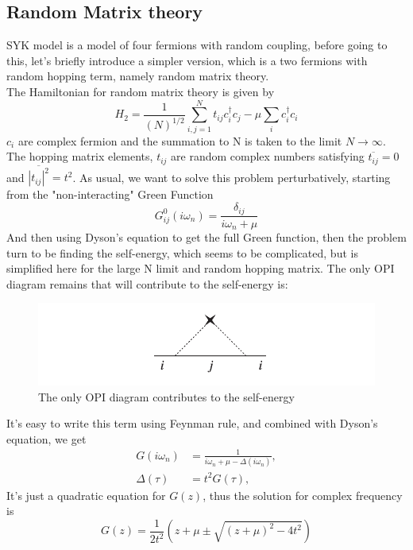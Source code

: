 \documentclass[10pt,openany]{book}
\theoremstyle{thmstyle} %
\theoremstyle{defstyle} %
\theoremstyle{prostyle} %
\begin{document}
\subsection{Random Matrix theory}
SYK model is a model of four fermions with random coupling, before going to this, let's briefly introduce a simpler version, which is a two fermions with random hopping term, namely random matrix theory.\\
The Hamiltonian for random matrix theory is given by
\begin{equation}
  H_2=\frac{1}{(N)^{1 / 2}} \sum_{i, j=1}^N t_{i j} c_i^{\dagger} c_j-\mu \sum_i c_i^{\dagger} c_i
\end{equation}
$c_i$ are complex fermion and the summation to N is taken to the limit $ N\to\infty $. The hopping matrix elements, $ t_{ij} $ are random complex numbers satisfying $\overline{t_{i j}}=0$ and $ \overline{\left|t_{i j}\right|^2}=t^2 $. As usual, we want to solve this problem perturbatively, starting from the "non-interacting" Green Function
\begin{equation*}
  G_{i j}^0\left(i \omega_n\right)=\frac{\delta_{i j}}{i \omega_n+\mu}
\end{equation*}
And then using Dyson's equation to get the full Green function, then the problem turn to be finding the self-energy, which seems to be complicated, but is simplified here for the large N limit and random hopping matrix. The only OPI diagram remains that will contribute to the self-energy is:
\begin{figure}[h]
  \centering
  \includegraphics*[scale = 1]{Figures/RMT.png}
  \caption{The only OPI diagram contributes to the self-energy}
  \label{RMT}
\end{figure}
It's easy to write this term using Feynman rule, and combined with Dyson's equation, we get
\begin{equation}
  \begin{aligned}
    G\left(i \omega_n\right) & =\frac{1}{i \omega_n+\mu-\Delta\left(i \omega_n\right)}, \\
    \Delta(\tau) & =t^2 G(\tau),
    \end{aligned}
\end{equation}
It's just a quadratic equation for $ G(z) $, thus the solution for complex frequency is
\begin{equation}
  G(z)=\frac{1}{2 t^2}\left(z+\mu \pm \sqrt{(z+\mu)^2-4 t^2}\right)
\end{equation} 
\end{document}
